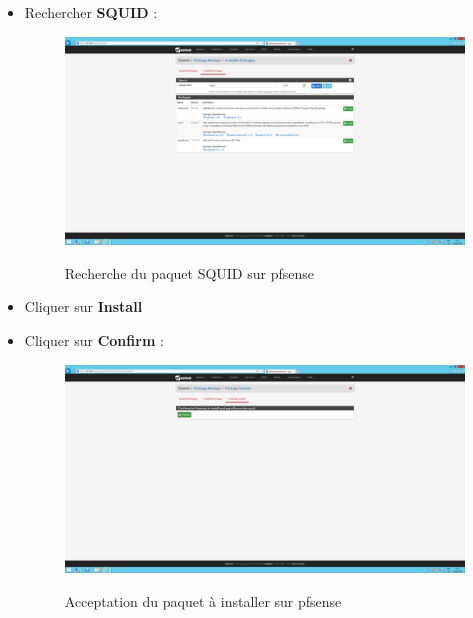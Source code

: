 \begin{itemize}
    \item Rechercher \textbf{SQUID} :
\begin{figure}[h!]
    \begin{center}
        \includegraphics[scale=0.23]{Pfsense_Screeshots/interception/5.png}
        \label{Pfsense_Screeshots/interception/5}
        \caption{Recherche du paquet SQUID sur pfsense}
    \end{center}
\end{figure}
\FloatBarrier 
    
    \item Cliquer sur \textbf{Install}
    \item Cliquer sur \textbf{Confirm} :
\begin{figure}[h!]
    \begin{center}
        \includegraphics[scale=0.23]{Pfsense_Screeshots/interception/6.png}
        \label{Pfsense_Screeshots/interception/6}
        \caption{Acceptation du paquet à installer sur pfsense}
    \end{center}
\end{figure}
\FloatBarrier 
    

\end{itemize}
